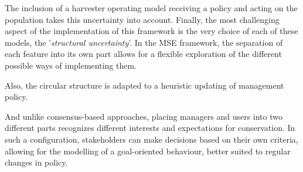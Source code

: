 \documentclass[12pt,a4paper]{article}
\begin{document}
The inclusion of a harvester operating model receiving a policy and acting on the population takes this uncertainty into account.
Finally, the most challenging aspect of the implementation of this framework is the very choice of each of these models, the '\textit{structural uncertainty}'.
In the MSE framework, the separation of each feature into its own part allows for a flexible exploration of the different possible ways of implementing them.

Also, the circular structure is adapted to a heuristic updating of management policy.

And unlike consensus-based approaches, placing managers and users into two different parts recognizes different interests and expectations for conservation.
In such a configuration, stakeholders can make decisions based on their own criteria, allowing for the modelling of a goal-oriented behaviour, better suited to regular changes in policy.

\end{document}
